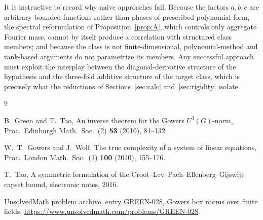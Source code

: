 \documentclass[11pt]{article}
\theoremstyle{remark}
\begin{document}
It is instructive to record why naive approaches fail. Because the factors
$a,b,c$ are arbitrary bounded functions rather than phases of prescribed
polynomial form, the spectral reformulation of Proposition~\ref{prop:A},
which controls only aggregate Fourier mass, cannot by itself produce a
correlation with structured class members; and because the class is not
finite-dimensional, polynomial-method and rank-based arguments do not
parametrize its members. Any successful approach must exploit the
interplay between the diagonal-derivative structure of the hypothesis and
the three-fold additive structure of the target class, which is precisely
what the reductions of Sections~\ref{sec:calc} and~\ref{sec:rigidity}
isolate.

\begin{thebibliography}{9}
\raggedright

B.~Green and T.~Tao,
An inverse theorem for the Gowers $U^{3}(G)$-norm,
Proc.\ Edinburgh Math.\ Soc.\ (2) \textbf{53} (2010), 81--132.

W.~T.~Gowers and J.~Wolf,
The true complexity of a system of linear equations,
Proc.\ London Math.\ Soc.\ (3) \textbf{100} (2010), 155--176.

T.~Tao,
A symmetric formulation of the Croot--Lev--Pach--Ellenberg--Gijswijt capset
bound,
electronic notes, 2016.

UnsolvedMath problem archive, entry GREEN-028,
Gowers box norms over finite fields,
\url{https://www.unsolvedmath.com/problems/GREEN-028}.

\end{thebibliography}
\end{document}
